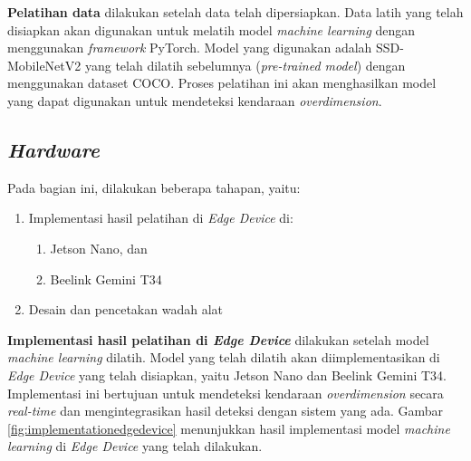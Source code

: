 \textbf{Pelatihan data} dilakukan setelah data telah dipersiapkan. Data latih yang telah disiapkan akan digunakan untuk melatih model \emph{machine learning} dengan menggunakan \emph{framework} PyTorch. Model yang digunakan adalah SSD-MobileNetV2 yang telah dilatih sebelumnya (\emph{pre-trained model}) dengan menggunakan dataset COCO. Proses pelatihan ini akan menghasilkan model yang dapat digunakan untuk mendeteksi kendaraan \emph{overdimension}.

\subsection{\emph{Hardware}}

Pada bagian ini, dilakukan beberapa tahapan, yaitu:
\begin{enumerate}[nolistsep]
  \item Implementasi hasil pelatihan di \emph{Edge Device} di:
  \begin{enumerate}[nolistsep]
    \item Jetson Nano, dan
    \item Beelink Gemini T34
  \end{enumerate} 
  \item Desain dan pencetakan wadah alat
\end{enumerate}

\textbf{Implementasi hasil pelatihan di \emph{Edge Device}} dilakukan setelah model \emph{machine learning} dilatih. Model yang telah dilatih akan diimplementasikan di \emph{Edge Device} yang telah disiapkan, yaitu Jetson Nano dan Beelink Gemini T34. Implementasi ini bertujuan untuk mendeteksi kendaraan \emph{overdimension} secara \emph{real-time} dan mengintegrasikan hasil deteksi dengan sistem yang ada. Gambar \ref{fig:implementationedgedevice} menunjukkan hasil implementasi model \emph{machine learning} di \emph{Edge Device} yang telah dilakukan.

